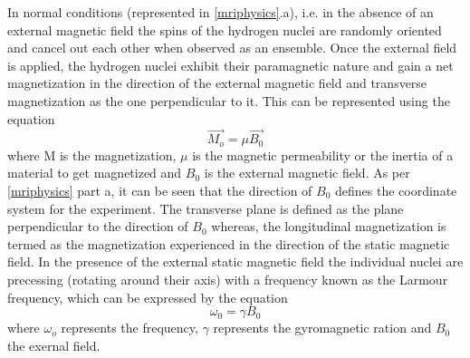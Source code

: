 \documentclass[msthesis.tex]{subfiles}
\begin{document}
In normal conditions (represented in \autoref{mriphysics}.a), i.e. in the absence of an external magnetic field the spins of the hydrogen nuclei are randomly oriented and cancel out each other when observed as an ensemble. Once the external field is applied, the hydrogen nuclei exhibit their paramagnetic nature and gain a net magnetization in the direction of the external magnetic field and transverse magnetization as the one perpendicular to it.  This can be represented using the equation
\begin{equation}
       \Vec{M_o} = \mu \Vec{B_0}
\end{equation}
where M is the magnetization, $\mu$ is the magnetic permeability or the inertia of a material to get magnetized and $B_0$ is the external magnetic field. As per  \autoref{mriphysics} part a, it can be seen that the direction of $B_0$ defines the coordinate system for the experiment. The transverse plane is defined as the plane perpendicular to the direction of $B_0$ whereas, the longitudinal magnetization is termed as the magnetization experienced in the direction of the static magnetic field. In the presence of the external static magnetic field the individual nuclei are precessing (rotating around their axis) with a frequency known as the Larmour frequency, which can be expressed by the equation
\begin{equation}
    \omega_0 = \gamma B_0
    \label{larmour}
\end{equation}
where $\omega_o$ represents the frequency, $\gamma$ represents the gyromagnetic ration and $B_0$ the exernal field.
\end{document}
